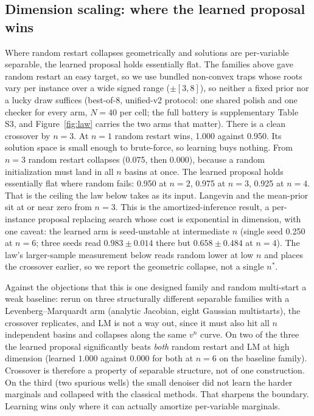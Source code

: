 \documentclass[letterpaper]{article} %
\begin{document}
\subsection{Dimension scaling: where the learned proposal wins}
\label{sec:scaling}

Where random restart collapses geometrically and solutions are per-variable separable, the
learned proposal holds essentially flat. The families above gave random restart an easy
target, so we use bundled non-convex traps whose roots vary per instance over a wide signed
range ($\pm[3,8]$), so neither a fixed prior nor a lucky draw suffices (best-of-8, unified-v2
protocol: one shared polish and one checker for every arm, $N{=}40$ per cell; the full battery
is supplementary Table S3, and Figure~\ref{fig:law} carries the two arms that
matter).
There is a clean crossover by $n = 3$. At $n = 1$ random restart wins, 1.000 against 0.950.
Its solution space is small enough to brute-force, so learning buys nothing. From $n = 3$
random restart collapses (0.075, then 0.000), because a random initialization must land in
all $n$ basins at once. The learned
proposal holds essentially flat where random fails: 0.950 at $n = 2$, 0.975 at $n = 3$, 0.925
at $n = 4$. That is the ceiling the law below takes as its input.
Langevin and the mean-prior sit at or near zero from $n = 3$. This is the amortized-inference
result, a per-instance proposal replacing search whose cost is exponential in dimension,
with one caveat: the learned arm is seed-unstable at intermediate $n$ (single seed
0.250 at $n = 6$; three seeds read $0.983 \pm 0.014$ there but $0.658 \pm 0.484$ at
$n = 4$). The law's larger-sample measurement below reads random lower at low $n$
and places the crossover earlier, so we report the geometric collapse, not a
single $n^*$.

Against the objections that this is one designed family and random multi-start a weak
baseline: rerun on three structurally different separable families with a
Levenberg--Marquardt arm (analytic Jacobian, eight Gaussian multistarts), the crossover
replicates, and LM is not a way out, since it must also hit all $n$ independent basins and
collapses along the same $v^n$ curve.
On two of the three the learned
proposal significantly beats \emph{both} random restart and LM at high dimension (learned
$1.000$ against $0.000$ for both at $n = 6$ on the baseline family). Crossover is
therefore a property of separable structure, not of one construction.
On the third (two spurious wells) the small denoiser did not learn the harder
marginals and collapsed with the classical methods. That sharpens the boundary. Learning
wins only where it can actually amortize per-variable marginals.
\end{document}
